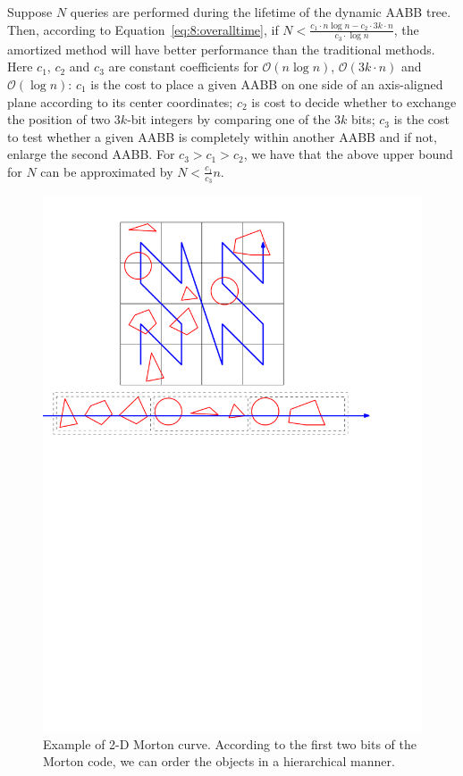 Suppose $N$ queries are performed during the lifetime of the dynamic
AABB tree. Then, according to Equation~\ref{eq:8:overalltime},
if $N < \frac{c_1 \cdot n \log n - c_2 \cdot 3 k \cdot n}{c_3 \cdot \log n}$, the amortized method will have better
performance than the traditional methods. Here $c_1$, $c_2$ and $c_3$ are constant coefficients for $\mathcal O(n\log n)$, $\mathcal O(3k \cdot n)$ and $\mathcal O(\log n)$: $c_1$ is the cost to place a given AABB on one side of an axis-aligned plane according to its center coordinates; $c_2$ is cost to decide whether to exchange the position of two $3k$-bit integers by comparing one of the $3k$ bits; $c_3$ is the cost to test whether a given AABB is completely within another AABB and if not, enlarge the second AABB. For $c_3 > c_1 > c_2$, we have that the above upper bound for $N$ can be approximated by $N < \frac{c_1}{c_3} n$.

\begin{figure}[htbp]
\centering
\includegraphics[width=0.8\linewidth]{figs/8/morton.pdf}
\caption[Illustration of 2-D Morton curve]{\label{fig:8:morton} Example of 2-D Morton curve. According to the first two
bits of the Morton code, we can order the objects in a hierarchical manner.}
\end{figure}



